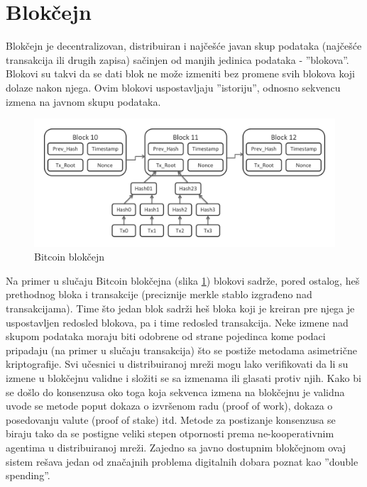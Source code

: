\documentclass[a4paper]{article}
\begin{document}
{\section{Blokčejn}
\label{sec:blockchain}

Blokčejn je decentralizovan, distribuiran i najčešće javan skup podataka (najčešće transakcija ili drugih zapisa) \cite{wood2014ethereum} sačinjen od manjih jedinica podataka - ''blokova''.
Blokovi su takvi da se dati blok ne može izmeniti bez promene svih blokova koji dolaze nakon njega. Ovim blokovi uspostavljaju ''istoriju'', odnosno sekvencu izmena na javnom skupu podataka.
\begin{figure}[H]
    \centering
        \includegraphics[scale=0.3]{bitcoin_blockchain_diagram.pdf}
    \caption{Bitcoin blokčejn}
    \label{fig:btc_blockchain}
\end{figure}
Na primer u slučaju Bitcoin blokčejna (slika \ref{fig:btc_blockchain}) blokovi sadrže, pored ostalog, heš prethodnog bloka i transakcije (preciznije merkle stablo izgrađeno nad transakcijama).
Time što jedan blok sadrži heš bloka koji je kreiran pre njega je uspostavljen redosled blokova, pa i time redosled transakcija.
Neke izmene nad skupom podataka moraju biti odobrene od strane pojedinca kome podaci pripadaju (na primer u slučaju transakcija) što se postiže metodama asimetrične kriptografije.
Svi učesnici u distribuiranoj mreži mogu lako verifikovati da li su izmene u blokčejnu validne i složiti se sa izmenama ili glasati protiv njih.
Kako bi se došlo do konsenzusa oko toga koja sekvenca izmena na blokčejnu je validna uvode se metode poput dokaza o izvršenom radu (proof of work), dokaza o posedovanju valute (proof of stake) itd.
Metode za postizanje konsenzusa se biraju tako da se postigne veliki stepen otpornosti prema ne-kooperativnim agentima u distribuiranoj mreži.
Zajedno sa javno dostupnim blokčejnom ovaj sistem rešava jedan od značajnih problema digitalnih dobara poznat kao ''double spending''. \cite{nakamoto2008bitcoin}

}
\end{document}
